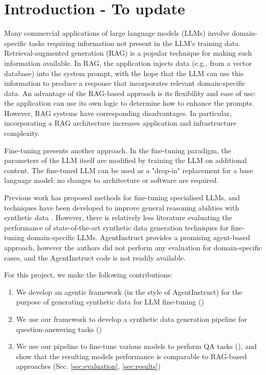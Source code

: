 \section{Introduction - To update}
Many commercial applications of large language models (LLMs) involve
domain-specific tasks requiring information not present in the LLM’s
training data. Retrieval-augmented generation (RAG)
\citep{lewis_retrieval-augmented_2020} is a popular technique for making such
information available. In RAG, the application injects data (e.g., from a
vector database) into the system prompt, with the hope that the LLM can use this
information to produce a response that incorporates relevant domain-specific
data. An advantage of the RAG-based approach is its flexibility and ease of use:
the application can use its own logic to determine how to enhance the prompts.
However, RAG systems have corresponding disadvantages. In particular,
incorporating a RAG architecture increases application and infrastructure
complexity.

Fine-tuning presents another approach. In the fine-tuning paradigm, the
parameters of the LLM itself are modified by training the LLM on additional
content. The fine-tuned LLM can be used as a "drop-in" replacement for a base
language model: no changes to architecture or software are required.

Previous work \citep{balaguer_rag_2024,yang_fingpt_2023,wu_pmc-llama_2023} has
proposed methods for fine-tuning specialised LLMs, and techniques have been
developed to improve general reasoning abilities with synthetic data
\citep{shao_synthetic_2023,wang_self-instruct_2023}. However, there is
relatively less literature evaluating the performance of state-of-the-art
synthetic data generation techniques for fine-tuning domain-specific LLMs.
AgentInstruct \citep{mitra_agentinstruct_2024} provides a promising agent-based
approach, however the authors did not perform any evaluation for domain-specific
cases, and the AgentInstruct code is not readily available.

For this project, we make the following contributions:

\begin{enumerate}
\item We develop an agentic framework (in the style of AgentInstruct) for the purpose
of generating synthetic data for LLM fine-tuning ()
\item We use our framework to develop a synthetic data generation pipeline for question-answering tasks
()
\item We use our pipeline to fine-tune various models to perform QA tasks (), and show that
the resulting models performance is comparable to RAG-based approaches (Sec. \ref{sec:evaluation}, \ref{sec:results})
\end{enumerate}
